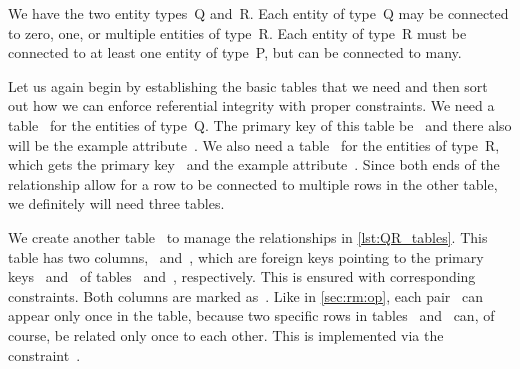 %
%
\label{sec:rm:qr}%
%
%
%
%
%
%
%
We have the two entity types~Q and~R.
Each entity of type~Q may be connected to zero, one, or multiple entities of type~R.
Each entity of type~R must be connected to at least one entity of type~P, but can be connected to many.

Let us again begin by establishing the basic tables that we need and then sort out how we can enforce referential integrity with proper constraints.
We need a table~ for the entities of type~Q.
The primary key of this table be~ and there also will be the example attribute~.
We also need a table~ for the entities of type~R, which gets the primary key~ and the example attribute~.
Since both ends of the relationship allow for a row to be connected to multiple rows in the other table, we definitely will need three tables.

We create another table~ to manage the relationships in \cref{lst:QR_tables}.
This table has two columns,~ and~, which are foreign keys pointing to the primary keys~ and~ of tables~ and~, respectively.
This is ensured with corresponding  constraints.
Both columns are marked as~.
Like in \cref{sec:rm:op}, each pair~ can appear only once in the table, because two specific rows in tables~ and~ can, of course, be related only once to each other.
This is implemented via the constraint~.

